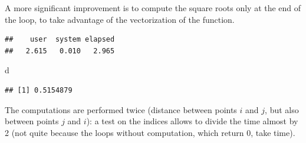 \documentclass[
  12pt,
  american,
  a4paper,
  extrafontsizes,onecolumn,openright
  ]{memoir}
\newenvironment{Shaded}{\begin{snugshade}}{\end{snugshade}}
\newcommand{\ControlFlowTok}[1]{\textcolor[rgb]{0.13,0.29,0.53}{\textbf{#1}}}
\newcommand{\DecValTok}[1]{\textcolor[rgb]{0.00,0.00,0.81}{#1}}
\newcommand{\FunctionTok}[1]{\textcolor[rgb]{0.13,0.29,0.53}{\textbf{#1}}}
\newcommand{\NormalTok}[1]{#1}
\newcommand{\OtherTok}[1]{\textcolor[rgb]{0.56,0.35,0.01}{#1}}
\newcommand{\SpecialCharTok}[1]{\textcolor[rgb]{0.81,0.36,0.00}{\textbf{#1}}}
\newlength{\rf}
\begin{document}
A more significant improvement is to compute the square roots only at the end of the loop, to take advantage of the vectorization of the function.

\scriptsize

\begin{Shaded}
\end{Shaded}

\begin{verbatim}
##    user  system elapsed 
##   2.615   0.010   2.965
\end{verbatim}

\begin{Shaded}
\begin{Highlighting}[]
\NormalTok{d}
\end{Highlighting}
\end{Shaded}

\begin{verbatim}
## [1] 0.5154879
\end{verbatim}

\normalsize

The computations are performed twice (distance between points \(i\) and \(j\), but also between points \(j\) and \(i\)): a test on the indices allows to divide the time almost by 2 (not quite because the loops without computation, which return \(0\), take time).
\end{document}
